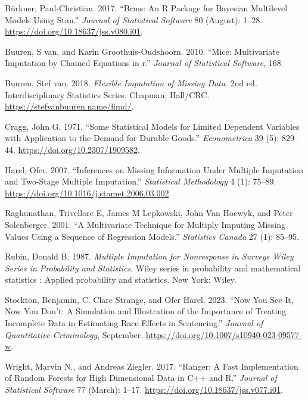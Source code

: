 \documentclass[
  letterpaper,
  DIV=11,
  numbers=noendperiod]{scrartcl}
\newlength{\cslhangindent}
\newlength{\cslentryspacingunit} %
\newenvironment{CSLReferences}[2] %
 {%
  \setlength{\parindent}{0pt}
  \ifodd #1
  \let\oldpar\par
  \def\par{\hangindent=\cslhangindent\oldpar}
  \fi
  \setlength{\parskip}{#2\cslentryspacingunit}
 }%
 {}
\begin{document}
\hypertarget{refs}{}
\begin{CSLReferences}{1}{0}
\leavevmode{}%
Bürkner, Paul-Christian. 2017. {``Brms: An R Package for Bayesian
Multilevel Models Using Stan.''} \emph{Journal of Statistical Software}
80 (August): 1--28. \url{https://doi.org/10.18637/jss.v080.i01}.

\leavevmode{}%
Buuren, S van, and Karin Groothuis-Oudshoorn. 2010. {``Mice:
Multivariate Imputation by Chained Equations in r.''} \emph{Journal of
Statistical Software}, 168.

\leavevmode{}%
Buuren, Stef van. 2018. \emph{Flexible Imputation of Missing Data}. 2nd
ed. Interdisciplinary Statistics Series. Chapman; Hall/CRC.
\url{https://stefvanbuuren.name/fimd/}.

\leavevmode{}%
Cragg, John G. 1971. {``Some {Statistical Models} for {Limited Dependent
Variables} with {Application} to the {Demand} for {Durable Goods}.''}
\emph{Econometrica} 39 (5): 829--44.
\url{https://doi.org/10.2307/1909582}.

\leavevmode{}%
Harel, Ofer. 2007. {``Inferences on Missing Information Under Multiple
Imputation and Two-Stage Multiple Imputation.''} \emph{Statistical
Methodology} 4 (1): 75--89.
\url{https://doi.org/10.1016/j.stamet.2006.03.002}.

\leavevmode{}%
Raghunathan, Trivellore E, James M Lepkowski, John Van Hoewyk, and Peter
Solenberger. 2001. {``A {Multivariate Technique} for {Multiply Imputing
Missing Values Using} a {Sequence} of {Regression Models}.''}
\emph{Statistics Canada} 27 (1): 85--95.

\leavevmode{}%
Rubin, Donald B. 1987. \emph{{Multiple Imputation for Nonresponse in
Surveys \textbar{} Wiley Series in Probability and Statistics}}. {Wiley
series in probability and mathematical statistics : Applied probability
and statistics}. {New York}: {Wiley}.

\leavevmode{}%
Stockton, Benjamin, C. Clare Strange, and Ofer Harel. 2023. {``Now You
See It, Now You Don{'}t: A Simulation and Illustration of the Importance
of Treating Incomplete Data in Estimating Race Effects in Sentencing.''}
\emph{Journal of Quantitative Criminology}, September.
\url{https://doi.org/10.1007/s10940-023-09577-w}.

\leavevmode{}%
Wright, Marvin N., and Andreas Ziegler. 2017. {``Ranger: {A Fast
Implementation} of {Random Forests} for {High Dimensional Data} in {C}++
and {R}.''} \emph{Journal of Statistical Software} 77 (March): 1--17.
\url{https://doi.org/10.18637/jss.v077.i01}.

\end{CSLReferences}
\end{document}
